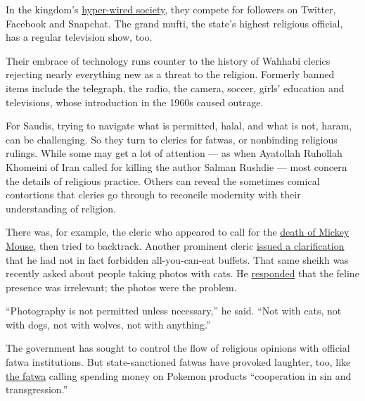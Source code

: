 In the kingdom's
\href{http://www.nytimes3xbfgragh.onion/2015/05/23/world/middleeast/saudi-arabia-youths-cellphone-apps-freedom.html?_r=0}{hyper-wired
society}, they compete for followers on Twitter, Facebook and Snapchat.
The grand mufti, the state's highest religious official, has a regular
television show, too.

Their embrace of technology runs counter to the history of Wahhabi
clerics rejecting nearly everything new as a threat to the religion.
Formerly banned items include the telegraph, the radio, the camera,
soccer, girls' education and televisions, whose introduction in the
1960s caused outrage.

For Saudis, trying to navigate what is permitted, halal, and what is
not, haram, can be challenging. So they turn to clerics for fatwas, or
nonbinding religious rulings. While some may get a lot of attention ---
as when Ayatollah Ruhollah Khomeini of Iran called for killing the
author Salman Rushdie --- most concern the details of religious
practice. Others can reveal the sometimes comical contortions that
clerics go through to reconcile modernity with their understanding of
religion.

There was, for example, the cleric who appeared to call for the
\href{https://www.youtube.com/watch?v=j7IpMIhR6Yg}{death of Mickey
Mouse}, then tried to backtrack. Another prominent cleric
\href{http://english.alarabiya.net/en/variety/2014/03/18/Saudi-cleric-claims-he-didn-t-issue-a-fatwa-against-all-you-can-eat-buffets.html}{issued
a clarification} that he had not in fact forbidden all-you-can-eat
buffets. That same sheikh was recently asked about people taking photos
with cats. He
\href{https://www.youtube.com/watch?v=aCMLdH1O6YU}{responded} that the
feline presence was irrelevant; the photos were the problem.

``Photography is not permitted unless necessary,'' he said. ``Not with
cats, not with dogs, not with wolves, not with anything.''

The government has sought to control the flow of religious opinions with
official fatwa institutions. But state-sanctioned fatwas have provoked
laughter, too, like
\href{http://alifta.com/Fatawa/fatawacoeval.aspx?languagename=en\&View=Page\&HajjEntryID=0\&HajjEntryName=\&RamadanEntryID=0\&RamadanEntryName=\&NodeID=4655\&PageID=14440\&SectionID=7\&SubjectPageTitlesID=15174\&MarkIndex=3\&0\#Intensiveintellectualinvasion}{the
fatwa} calling spending money on Pokemon products ``cooperation in sin
and transgression.''

